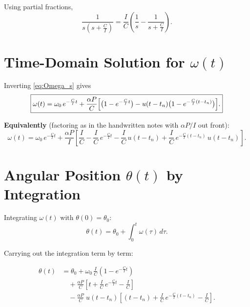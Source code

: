 \documentclass[11pt,a4paper]{article}
\begin{document}
Using partial fractions,
\[
  \frac{1}{s\!\left(s+\frac{C}{I}\right)}
  = \frac{I}{C}\left(\frac{1}{s} - \frac{1}{s+\frac{C}{I}}\right).
\]

\section{Time-Domain Solution for $\omega(t)$}

Inverting \eqref{eq:Omega_s} gives
\begin{equation}\label{eq:omega_t}
\boxed{
  \omega(t)
  = \omega_0\, e^{-\frac{C}{I}t}
  + \frac{\alpha P}{C}
    \Bigl[\bigl(1 - e^{-\frac{C}{I}t}\bigr)
    - u(t-t_n)\bigl(1 - e^{-\frac{C}{I}(t-t_n)}\bigr)\Bigr].
}
\end{equation}

\textbf{Equivalently} (factoring as in the handwritten notes with $\alpha P/I$
out front):
\[
  \omega(t)
  = \omega_0\, e^{-\frac{C}{I}t}
  + \frac{\alpha P}{I}\left[
      \frac{I}{C} - \frac{I}{C}\,e^{-\frac{C}{I}t}
      - \frac{I}{C}\,u(t-t_n)
      + \frac{I}{C}\,e^{-\frac{C}{I}(t-t_n)}\,u(t-t_n)
    \right].
\]

\section{Angular Position $\theta(t)$ by Integration}

Integrating $\omega(t)$ with $\theta(0)=\theta_0$:
\[
  \theta(t) = \theta_0 + \int_0^{t} \omega(\tau)\,d\tau.
\]

Carrying out the integration term by term:

\begin{equation}\label{eq:theta_t}
\boxed{
\begin{aligned}
  \theta(t)
  &= \theta_0
   + \omega_0\,\frac{I}{C}\!\left(1 - e^{-\frac{C}{I}t}\right) \\[6pt]
  &\quad + \frac{\alpha P}{C}\left[
      t + \frac{I}{C}\,e^{-\frac{C}{I}t} - \frac{I}{C}
    \right] \\[6pt]
  &\quad - \frac{\alpha P}{C}\;u(t-t_n)\left[
      (t - t_n) + \frac{I}{C}\,e^{-\frac{C}{I}(t-t_n)} - \frac{I}{C}
    \right].
\end{aligned}
}
\end{equation}
\end{document}
